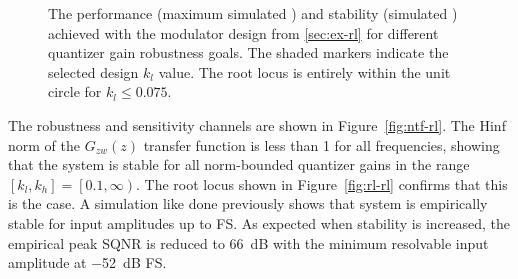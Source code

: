 \begin{figure}
	\begin{NoHyper}
		\begin{center}
		\end{center}
	\end{NoHyper}
	\caption{The performance (maximum simulated ) and stability (simulated ) achieved with the modulator design from \autoref{sec:ex-rl} for different quantizer gain robustness goals. The shaded markers indicate the selected design $k_l$ value. The root locus is entirely within the unit circle for $k_l \leq 0.075$.} \label{fig:robust-perf-stab}
\end{figure}

The robustness and sensitivity channels are shown in Figure~\ref{fig:ntf-rl}. The \gls{Hinf} norm of the $G_{zw}(z)$ transfer function is less than 1 for all frequencies, showing that the system is stable for all norm-bounded quantizer gains in the range $\left[k_l, k_h\right] = \left[0.1, \infty\right)$. The root locus shown in Figure~\ref{fig:rl-rl} confirms that this is the case. A simulation like done previously shows that system is empirically stable for input amplitudes up to \gls{FS}. As expected when stability is increased, the empirical peak SQNR is reduced to \SI{66}{\deci\bel} with the minimum resolvable input amplitude at \SI{-52}{\deci\bel} \gls{FS}.

